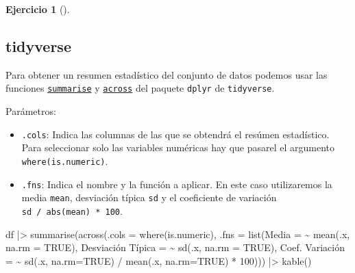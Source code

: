 \documentclass[
  spanish,
  a4paper,
]{scrreport}
\newenvironment{Shaded}{\begin{snugshade}}{\end{snugshade}}
\newcommand{\AttributeTok}[1]{\textcolor[rgb]{0.40,0.45,0.13}{#1}}
\newcommand{\ConstantTok}[1]{\textcolor[rgb]{0.56,0.35,0.01}{#1}}
\newcommand{\DecValTok}[1]{\textcolor[rgb]{0.68,0.00,0.00}{#1}}
\newcommand{\ErrorTok}[1]{\textcolor[rgb]{0.68,0.00,0.00}{#1}}
\newcommand{\FunctionTok}[1]{\textcolor[rgb]{0.28,0.35,0.67}{#1}}
\newcommand{\NormalTok}[1]{\textcolor[rgb]{0.00,0.23,0.31}{#1}}
\newcommand{\OtherTok}[1]{\textcolor[rgb]{0.00,0.23,0.31}{#1}}
\newcommand{\SpecialCharTok}[1]{\textcolor[rgb]{0.37,0.37,0.37}{#1}}
\newcommand{\StringTok}[1]{\textcolor[rgb]{0.13,0.47,0.30}{#1}}
\providecommand{\tightlist}{%
  \setlength{\itemsep}{0pt}\setlength{\parskip}{0pt}}
\theoremstyle{definition}
\newtheorem{exercise}{Ejercicio}[chapter]
\theoremstyle{remark}
\begin{document}
\begin{exercise}[]
\begin{enumerate}
\begin{tcolorbox}
  \section{tidyverse}

  Para obtener un resumen estadístico del conjunto de datos podemos usar
  las funciones
  \href{https://dplyr.tidyverse.org/reference/summarise.html}{\texttt{summarise}}
  y
  \href{https://dplyr.tidyverse.org/reference/across.html}{\texttt{across}}
  del paquete \texttt{dplyr} de \texttt{tidyverse}.

  Parámetros:

  \begin{itemize}
  \tightlist
  \item
    \texttt{.cols}: Indica las columnas de las que se obtendrá el
    resúmen estadístico. Para seleccionar solo las variables numéricas
    hay que pasarel el argumento \texttt{where(is.numeric)}.
  \item
    \texttt{.fns}: Indica el nombre y la función a aplicar. En este caso
    utilizaremos la media \texttt{mean}, desviación típica \texttt{sd} y
    el coeficiente de variación \texttt{sd\ /\ abs(mean)\ *\ 100}.
  \end{itemize}

\begin{Shaded}
\begin{Highlighting}[]
\NormalTok{df }\SpecialCharTok{|\textgreater{}} \FunctionTok{summarise}\NormalTok{(}\FunctionTok{across}\NormalTok{(}\AttributeTok{.cols =} \FunctionTok{where}\NormalTok{(is.numeric), }\AttributeTok{.fns =} \FunctionTok{list}\NormalTok{(}\AttributeTok{Media =} \SpecialCharTok{\textasciitilde{}} \FunctionTok{mean}\NormalTok{(.x, }\AttributeTok{na.rm =} \ConstantTok{TRUE}\NormalTok{), }\StringTok{\textasciigrave{}}\AttributeTok{Desviación Típica}\StringTok{\textasciigrave{}} \OtherTok{=} \ErrorTok{\textasciitilde{}} \FunctionTok{sd}\NormalTok{(.x, }\AttributeTok{na.rm =} \ConstantTok{TRUE}\NormalTok{), }\StringTok{\textasciigrave{}}\AttributeTok{Coef. Variación}\StringTok{\textasciigrave{}} \OtherTok{=} \ErrorTok{\textasciitilde{}} \FunctionTok{sd}\NormalTok{(.x, }\AttributeTok{na.rm=}\ConstantTok{TRUE}\NormalTok{) }\SpecialCharTok{/} \FunctionTok{mean}\NormalTok{(.x, }\AttributeTok{na.rm=}\ConstantTok{TRUE}\NormalTok{) }\SpecialCharTok{*} \DecValTok{100}\NormalTok{))) }\SpecialCharTok{|\textgreater{}}
    \FunctionTok{kable}\NormalTok{()}
\end{Highlighting}
\end{Shaded}


\end{tcolorbox}
\end{enumerate}
\end{exercise}
\end{document}
